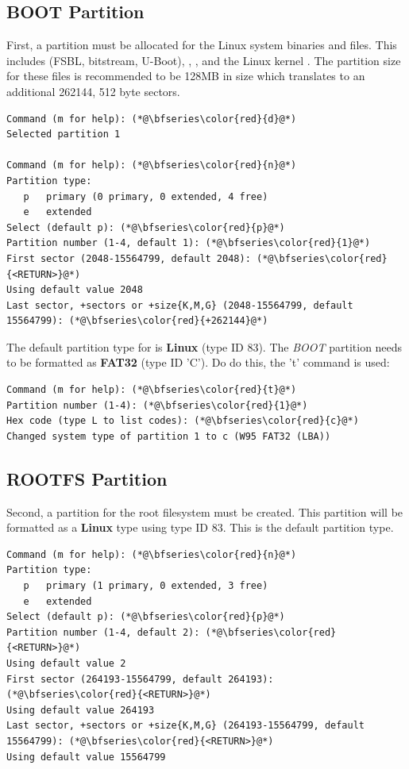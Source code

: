 \subsection{BOOT Partition}
First, a partition must be allocated for the Linux system binaries and files. This includes  (FSBL, bitstream, U-Boot), , , and the Linux kernel . The partition size for these files is recommended to be 128MB in size which translates to an additional 262144, 512 byte sectors.


\clearpage
\begin{lstlisting}[style=text]
Command (m for help): (*@\bfseries\color{red}{d}@*)
Selected partition 1

Command (m for help): (*@\bfseries\color{red}{n}@*)
Partition type:
   p   primary (0 primary, 0 extended, 4 free)
   e   extended
Select (default p): (*@\bfseries\color{red}{p}@*)
Partition number (1-4, default 1): (*@\bfseries\color{red}{1}@*)
First sector (2048-15564799, default 2048): (*@\bfseries\color{red}{<RETURN>}@*)
Using default value 2048
Last sector, +sectors or +size{K,M,G} (2048-15564799, default 15564799): (*@\bfseries\color{red}{+262144}@*)
\end{lstlisting}



The default partition type for  is \textbf{Linux} (type ID 83). The \textit{BOOT} partition needs to be formatted as \textbf{FAT32} (type ID 'C'). Do do this, the 't' command is used:


\begin{lstlisting}[style=text]
Command (m for help): (*@\bfseries\color{red}{t}@*)
Partition number (1-4): (*@\bfseries\color{red}{1}@*)
Hex code (type L to list codes): (*@\bfseries\color{red}{c}@*)
Changed system type of partition 1 to c (W95 FAT32 (LBA))
\end{lstlisting}


\subsection{ROOTFS Partition}
Second, a partition for the root filesystem must be created. This partition will be formatted as a \textbf{Linux} type using type ID 83. This is the default partition type.


\begin{lstlisting}[style=text]
Command (m for help): (*@\bfseries\color{red}{n}@*)
Partition type:
   p   primary (1 primary, 0 extended, 3 free)
   e   extended
Select (default p): (*@\bfseries\color{red}{p}@*)
Partition number (1-4, default 2): (*@\bfseries\color{red}{<RETURN>}@*)
Using default value 2
First sector (264193-15564799, default 264193): (*@\bfseries\color{red}{<RETURN>}@*)
Using default value 264193
Last sector, +sectors or +size{K,M,G} (264193-15564799, default 15564799): (*@\bfseries\color{red}{<RETURN>}@*)
Using default value 15564799
\end{lstlisting}


